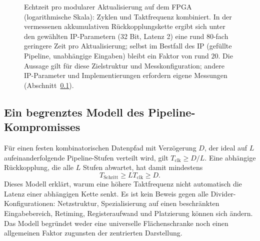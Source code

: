 \documentclass[11pt,a4paper]{scrartcl}
\theoremstyle{definition}
\theoremstyle{plain}
\theoremstyle{remark}
\begin{document}
\begin{figure}[htbp]
\centering
{}
\caption{Echtzeit pro modularer Aktualisierung auf dem FPGA (logarithmische Skala): Zyklen und Taktfrequenz kombiniert. In der vermessenen akkumulativen Rückkopplungskette ergibt sich unter den gewählten IP-Parametern (32 Bit, Latenz 2) eine rund $80$-fach geringere Zeit pro Aktualisierung; selbst im Bestfall des IP (gefüllte Pipeline, unabhängige Eingaben) bleibt ein Faktor von rund $20$. Die Aussage gilt für diese Zielstruktur und Messkonfiguration; andere IP-Parameter und Implementierungen erfordern eigene Messungen (Abschnitt~\ref{sec:latenztradeoff}).}
\label{fig:fpgawall}
\end{figure}

\subsection{Ein begrenztes Modell des Pipeline-Kompromisses}
\label{sec:latenztradeoff}
Für einen festen kombinatorischen Datenpfad mit Verzögerung $D$, der ideal auf $L$ aufeinanderfolgende Pipeline-Stufen verteilt wird, gilt $T_{\mathrm{clk}}\ge D/L$. Eine abhängige Rückkopplung, die alle $L$ Stufen abwartet, hat damit mindestens
\[
T_{\mathrm{Schritt}}\ge L T_{\mathrm{clk}}\ge D.
\]
Dieses Modell erklärt, warum eine höhere Taktfrequenz nicht automatisch die Latenz einer abhängigen Kette senkt. Es ist kein Beweis gegen alle Divider-Konfigurationen: Netzstruktur, Spezialisierung auf einen beschränkten Eingabebereich, Retiming, Registeraufwand und Platzierung können sich ändern. Das Modell begründet weder eine universelle Flächenschranke noch einen allgemeinen Faktor zugunsten der zentrierten Darstellung.
\end{document}
